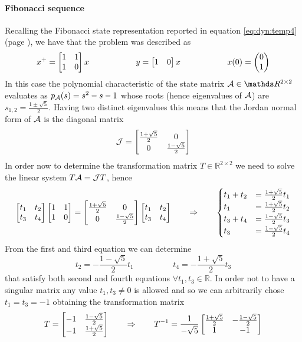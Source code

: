 		\paragraph{Fibonacci sequence} Recalling the Fibonacci state representation reported in equation \ref{eq:dyn:temp4} (page \pageref{eq:dyn:temp4}), we have that the problem was described as
		\[ x^+ = \begin{bmatrix} 1 & 1 \\ 1 & 0 \end{bmatrix} x \hspace{2cm} y = \begin{bmatrix} 1 & 0 \end{bmatrix} x \hspace{2cm} x(0) = \begin{pmatrix} 0 \\ 1 \end{pmatrix} \]
		In this case the polynomial characteristic of the state matrix $\A \in \mathds R^{2\times 2}$ evaluates as $p_{\mathcal{A}}(s) = s^2-s-1$ whose roots (hence eigenvalues of $\mathcal{A}$) are $s_{1,2} = \frac{1\pm \sqrt 5}{2}$. Having two distinct eigenvalues this means that the Jordan normal form of $\mathcal{A}$ is the diagonal matrix
		\[ \mathcal{J}= \begin{bmatrix} \frac{1+\sqrt 5}{2} & 0 \\ 0 & \frac{1-\sqrt 5}{2} \end{bmatrix} \]
		In order now to determine the transformation matrix $T \in \mathds R^{2\times 2}$ we need to solve the linear system $T\mathcal{A} = \mathcal{J} T$, hence
		\[ \begin{bmatrix} t_1 & t_2 \\ t_3 & t_4 \end{bmatrix} \begin{bmatrix} 1 & 1 \\ 1 & 0 \end{bmatrix} = \begin{bmatrix} \frac{1+\sqrt 5}{2} & 0 \\ 0 & \frac{1-\sqrt 5}{2} \end{bmatrix} \begin{bmatrix} t_1 & t_2 \\ t_3 & t_4 \end{bmatrix} \qquad \Rightarrow \qquad \begin{cases}
			t_1 + t_2  & = \frac{1+\sqrt 5}{2} t_1 \\
			t_1  & = \frac{1+\sqrt 5}{2} t_2 \\
			t_3 + t_4 & = \frac{1-\sqrt 5}{2} t_3 \\
			t_3 & =  \frac{1-\sqrt 5}{2 } t_4
		\end{cases}   \]
		From the first and third equation we can determine
		\[ t_2 = - \frac{1-\sqrt 5}{2}t_1 \hspace{2cm} t_4 = - \frac{1+\sqrt 5}{2} t_3 \]
		that satisfy both second and fourth equations $\forall t_1,t_3 \in \mathds R$. In order not to have a singular matrix any value $t_1,t_3\neq 0$ is allowed and so we can arbitrarily chose $t_1 = t_3 = -1$ obtaining the transformation matrix
		\[ T = \begin{bmatrix} -1 & \frac{1-\sqrt 5}{2} \\ -1 & \frac{1+\sqrt 5}{2}  \end{bmatrix} \qquad \Rightarrow \qquad T^{-1} = \frac1{-\sqrt 5} \begin{bmatrix} \frac{1+\sqrt 5}{2} & - \frac{1-\sqrt 5}{2} \\ 1 & -1 \end{bmatrix} \]
		
		
		
		
		
		
		
		
		
		
		
		
		
		
		
		
		
		
		